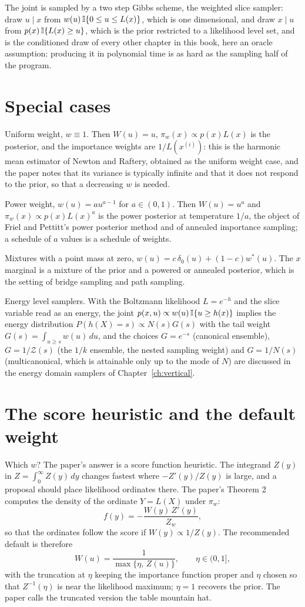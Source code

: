 The joint is sampled by a two step Gibbs scheme, the weighted slice sampler: draw $u \mid x$ from $w(u) \, \mathbb{I}\{ 0 \le u \le L(x) \}$, which is one dimensional, and draw $x \mid u$ from $p(x) \, \mathbb{I}\{ L(x) \ge u \}$, which is the prior restricted to a likelihood level set, and is the conditioned draw of every other chapter in this book, here an oracle assumption: producing it in polynomial time is as hard as the sampling half of the program.

\section{Special cases}

Uniform weight, $w \equiv 1$. Then $W(u) = u$, $\pi_w(x) \propto p(x) L(x)$ is the posterior, and the importance weights are $1 / L(x^{(i)})$: this is the harmonic mean estimator of Newton and Raftery, obtained as the uniform weight case, and the paper notes that its variance is typically infinite and that it does not respond to the prior, so that a decreasing $w$ is needed.

Power weight, $w(u) = a u^{a-1}$ for $a \in (0, 1)$. Then $W(u) = u^a$ and $\pi_w(x) \propto p(x) L(x)^a$ is the power posterior at temperature $1/a$, the object of Friel and Pettitt's power posterior method and of annealed importance sampling; a schedule of $a$ values is a schedule of weights.

Mixtures with a point mass at zero, $w(u) = c \, \delta_0(u) + (1 - c) w^*(u)$. The $x$ marginal is a mixture of the prior and a powered or annealed posterior, which is the setting of bridge sampling and path sampling.

Energy level samplers. With the Boltzmann likelihood $L = e^{-h}$ and the slice variable read as an energy, the joint $p(x, u) \propto w(u) \, \mathbb{I}\{ u \ge h(x) \}$ implies the energy distribution $P(h(X) = s) \propto N(s) G(s)$ with the tail weight $G(s) = \int_{u \ge s} w(u) \, du$, and the choices $G = e^{-s}$ (canonical ensemble), $G = 1/\mathcal{Z}(s)$ (the $1/k$ ensemble, the nested sampling weight) and $G = 1/N(s)$ (multicanonical, which is attainable only up to the mode of $N$) are discussed in the energy domain samplers of Chapter~\ref{ch:vertical}.

\section{The score heuristic and the default weight}

Which $w$? The paper's answer is a score function heuristic. The integrand $Z(y)$ in $Z = \int_0^\infty Z(y) \, dy$ changes fastest where $-Z'(y) / Z(y)$ is large, and a proposal should place likelihood ordinates there. The paper's Theorem 2 computes the density of the ordinate $Y = L(X)$ under $\pi_w$:
\[
f(y) = -\frac{ W(y) \, Z'(y) }{ Z_w } ,
\]
so that the ordinates follow the score if $W(y) \propto 1 / Z(y)$. The recommended default is therefore
\[
W(u) = \frac{1}{ \max\{ \eta, \, Z(u) \} } , \qquad \eta \in (0, 1] ,
\]
with the truncation at $\eta$ keeping the importance function proper and $\eta$ chosen so that $Z^{-1}(\eta)$ is near the likelihood maximum; $\eta = 1$ recovers the prior. The paper calls the truncated version the table mountain hat.

